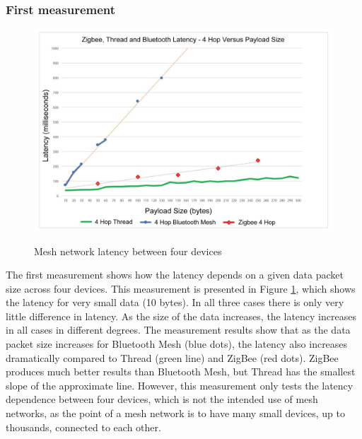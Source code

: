 \subsubsection{First measurement}
\begin{figure}[!htb]
    \centering
    \includegraphics[width=\textwidth]{img/mesh-latency-over-four-hops.png}
    \caption{Mesh network latency between four devices}
    \label{fig:threadoverfourhops}
    \cite{threadSilabs}
\end{figure}
\noindent
The first measurement shows how the latency depends on a given data packet size across four devices. This measurement is presented in Figure \ref{fig:threadoverfourhops}, which shows the latency for very small data (10 bytes). In all three cases there is only very little difference in latency. As the size of the data increases, the latency increases in all cases in different degrees. The measurement results show that as the data packet size increases for Bluetooth Mesh (blue dots), the latency also increases dramatically compared to Thread (green line) and ZigBee (red dots). ZigBee produces much better results than Bluetooth Mesh, but Thread has the smallest slope of the approximate line. However, this measurement only tests the latency dependence between four devices, which is not the intended use of mesh networks, as the point of a mesh network is to have many small devices, up to thousands, connected to each other.


